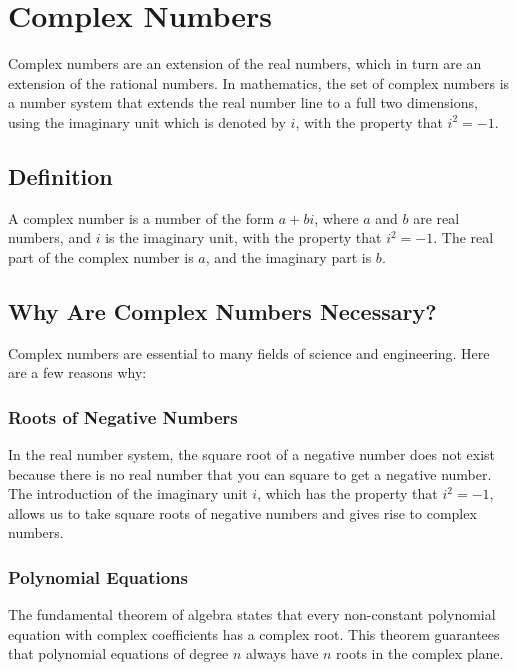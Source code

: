 \chapter{Complex Numbers}

Complex numbers are an extension of the real numbers, which in turn
are an extension of the rational numbers. In mathematics, the set of
complex numbers is a number system that extends the real number line
to a full two dimensions, using the imaginary unit which is denoted by
$i$, with the property that $i^2 = -1$.

\section{Definition}

A complex number is a number of the form $a + bi$, where $a$ and $b$
are real numbers, and $i$ is the imaginary unit, with the property
that $i^2 = -1$. The real part of the complex number is $a$, and the
imaginary part is $b$.

\section{Why Are Complex Numbers Necessary?}

Complex numbers are essential to many fields of science and
engineering. Here are a few reasons why:

\subsection{Roots of Negative Numbers}

In the real number system, the square root of a negative number does
not exist because there is no real number that you can square to get a
negative number. The introduction of the imaginary unit $i$, which has
the property that $i^2 = -1$, allows us to take square roots of
negative numbers and gives rise to complex numbers.

\subsection{Polynomial Equations}

The fundamental theorem of algebra states that every non-constant
polynomial equation with complex coefficients has a complex root. This
theorem guarantees that polynomial equations of degree $n$ always have
$n$ roots in the complex plane.

